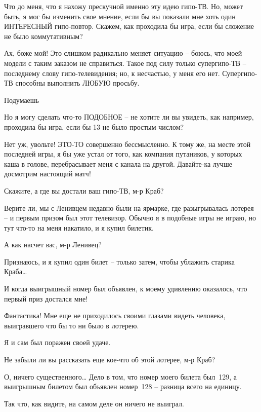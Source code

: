 \documentclass[../main.tex]{subfiles}
\begin{document}
\begin{dialogue}
 Что до меня, что я нахожу прескучной именно эту идею гипо-ТВ. Но, может быть, я мог бы изменить свое мнение, если бы вы показали мне хоть один ИНТЕРЕСНЫЙ гипо-повтор. Скажем, как проходила бы игра, если бы сложение не было коммутативным?

 Ах, боже мой! Это слишком радикально меняет ситуацию \--- боюсь, что моей модели с таким заказом не справиться. Такое под силу только супергипо-ТВ \--- последнему слову гипо-телевидения; но, к несчастью, у меня его нет. Супергипо-ТВ способны выполнить ЛЮБУЮ просьбу.

 Подумаешь\edots

 Но я могу сделать что-то ПОДОБНОЕ \--- не хотите ли вы увидеть, как например, проходила бы игра, если бы 13 не было простым числом?

 Нет уж, увольте! ЭТО-ТО совершенно бессмысленно. К тому же, на месте этой последней игры, я бы уже устал от того, как компания путаников, у которых каша в голове, перебрасывает меня с канала на другой. Давайте-ка лучше досмотрим настоящий матч!

 Скажите, а где вы достали ваш гипо-ТВ, м-р Краб?

 Верите ли, мы с Ленивцем недавно были на ярмарке, где разыгрывалась лотерея \--- и первым призом был этот телевизор. Обычно я в подобные игры не играю, но тут что-то на меня накатило, и я купил билетик.

 А как насчет вас, м-р Ленивец?

 Признаюсь, и я купил один билет \--- только затем, чтобы ублажить старика Краба\ldots{}

 И когда выигрышный номер был объявлен, к моему удивлению оказалось, что первый приз достался мне!

 Фантастика! Мне еще не приходилось своими глазами видеть человека, выигравшего что бы то ни было в лотерею.

 Я и сам был поражен своей удаче.

 Не забыли ли вы рассказать еще кое-что об этой лотерее, м-р Краб?

 О, ничего существенного\ldots{} Дело в том, что номер моего билета был~129, а выигрышным билетом был объявлен номер~128 \--- разница всего на единицу.

 Так что, как видите, на самом деле он ничего не выиграл.


\end{dialogue}
\end{document}
